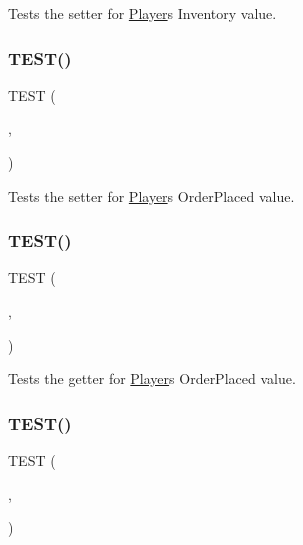 Tests the setter for \hyperlink{classPlayer}{Player}\textquotesingle{}s Inventory value. \mbox{\label{group__group1_ga8fd27440e6581d8a734cdfdbbbc6f83f}} 
\subsubsection{\texorpdfstring{T\+E\+S\+T()}{TEST()}\hspace{0.1cm}{\footnotesize\ttfamily [13/18]}}
{\footnotesize\ttfamily T\+E\+ST (\begin{DoxyParamCaption}\item[{player\+Test}]{,  }\item[{set\+Order\+Placed\+Test}]{ }\end{DoxyParamCaption})}

Tests the setter for \hyperlink{classPlayer}{Player}\textquotesingle{}s Order\+Placed value. \mbox{\label{group__group1_gab4bed2eb3526372ad33bfe2e7555b635}} 
\subsubsection{\texorpdfstring{T\+E\+S\+T()}{TEST()}\hspace{0.1cm}{\footnotesize\ttfamily [14/18]}}
{\footnotesize\ttfamily T\+E\+ST (\begin{DoxyParamCaption}\item[{player\+Test}]{,  }\item[{get\+Order\+Placed\+Test}]{ }\end{DoxyParamCaption})}

Tests the getter for \hyperlink{classPlayer}{Player}\textquotesingle{}s Order\+Placed value. \mbox{\label{group__group1_gad11664b855d5e016ed1294f09ed0ce90}} 
\subsubsection{\texorpdfstring{T\+E\+S\+T()}{TEST()}\hspace{0.1cm}{\footnotesize\ttfamily [15/18]}}
{\footnotesize\ttfamily T\+E\+ST (\begin{DoxyParamCaption}\item[{player\+Test}]{,  }\item[{set\+Demand\+Test}]{ }\end{DoxyParamCaption})}

